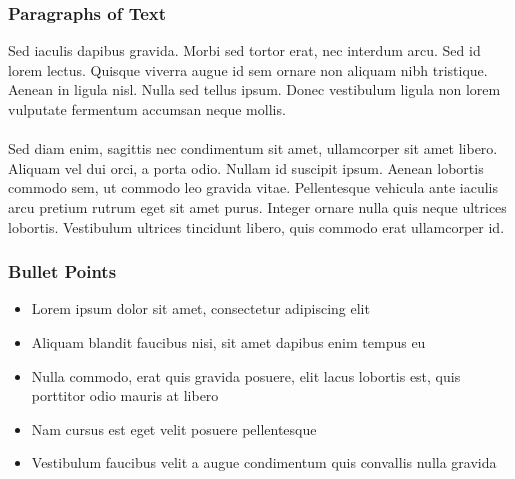 \documentclass{beamer}
\begin{document}



\begin{frame}
\frametitle{Paragraphs of Text}
Sed iaculis dapibus gravida. Morbi sed tortor erat, nec interdum arcu. Sed id lorem lectus. Quisque viverra augue id sem ornare non aliquam nibh tristique. Aenean in ligula nisl. Nulla sed tellus ipsum. Donec vestibulum ligula non lorem vulputate fermentum accumsan neque mollis.\\~\\

Sed diam enim, sagittis nec condimentum sit amet, ullamcorper sit amet libero. Aliquam vel dui orci, a porta odio. Nullam id suscipit ipsum. Aenean lobortis commodo sem, ut commodo leo gravida vitae. Pellentesque vehicula ante iaculis arcu pretium rutrum eget sit amet purus. Integer ornare nulla quis neque ultrices lobortis. Vestibulum ultrices tincidunt libero, quis commodo erat ullamcorper id.
\end{frame}


\begin{frame}
\frametitle{Bullet Points}
\begin{itemize}
\item Lorem ipsum dolor sit amet, consectetur adipiscing elit
\item Aliquam blandit faucibus nisi, sit amet dapibus enim tempus eu
\item Nulla commodo, erat quis gravida posuere, elit lacus lobortis est, quis porttitor odio mauris at libero
\item Nam cursus est eget velit posuere pellentesque
\item Vestibulum faucibus velit a augue condimentum quis convallis nulla gravida
\end{itemize}
\end{frame}

\end{document}
